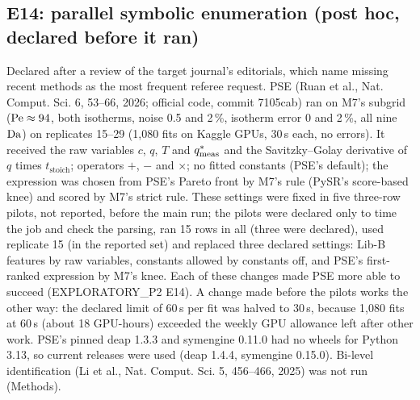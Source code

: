 \subsection*{E14: parallel symbolic enumeration (post hoc, declared before it ran)}
Declared after a review of the target journal's editorials, which name missing recent methods as the most
frequent referee request. PSE (Ruan et al., Nat. Comput. Sci. 6, 53--66, 2026; official code, commit 7105cab) ran on M7's subgrid
($\mathrm{Pe} \approx 94$, both isotherms, noise 0.5 and 2\,\%, isotherm error 0 and 2\,\%, all nine $\mathrm{Da}$) on replicates
15--29 (1,080 fits on Kaggle GPUs, 30\,s each, no errors). It received the raw variables $c$, $q$, $T$ and $q^{*}_{\mathrm{meas}}$
and the Savitzky--Golay derivative of $q$ times $t_{\mathrm{stoich}}$; operators $+$, $-$ and $\times$; no fitted
constants (PSE's default); the expression was chosen from PSE's Pareto front by M7's rule (PySR's
score-based knee) and scored by M7's strict rule. These settings were fixed in five three-row pilots,
not reported, before the main run; the pilots were declared only to time the job and check the parsing,
ran 15 rows in all (three were declared), used replicate 15 (in the reported set) and replaced three
declared settings: Lib-B features by raw variables, constants allowed by constants off, and PSE's
first-ranked expression by M7's knee. Each of these changes made PSE more able to succeed
(EXPLORATORY\_P2 E14). A change made before the pilots works the other way: the declared limit of 60\,s
per fit was halved to 30\,s, because 1,080 fits at 60\,s (about 18 GPU-hours) exceeded the weekly GPU
allowance left after other work. PSE's pinned deap 1.3.3 and symengine 0.11.0 had no wheels for
Python 3.13, so current releases were used (deap 1.4.4, symengine 0.15.0).
Bi-level identification (Li et al., Nat. Comput. Sci. 5, 456--466, 2025) was not run (Methods).

